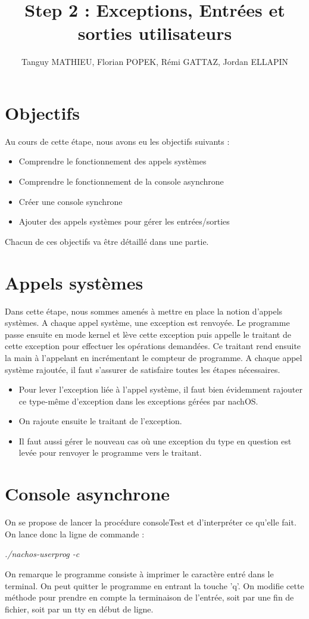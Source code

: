 \documentclass[a4paper,10pt]{article}
\title{Step 2 : Exceptions, Entrées et sorties utilisateurs}
\author{Tanguy MATHIEU, Florian POPEK, Rémi GATTAZ, Jordan ELLAPIN}
\begin{document}
\maketitle
\tableofcontents

\newpage
\section{Objectifs}
    Au cours de cette étape, nous avons eu les objectifs suivants :
    \begin{itemize}
        \item Comprendre le fonctionnement des appels systèmes
        \item Comprendre le fonctionnement de la console asynchrone
        \item Créer une console synchrone
        \item Ajouter des appels systèmes pour gérer les entrées/sorties
    \end{itemize}

    Chacun de ces objectifs va être détaillé dans une partie.

\section{Appels systèmes}
    Dans cette étape, nous sommes amenés à mettre en place la notion d'appels systèmes. A chaque appel système, une exception est renvoyée. Le programme passe ensuite en mode kernel et lève cette exception puis appelle le traitant de cette exception pour effectuer les opérations demandées. Ce traitant rend ensuite la main à l'appelant en incrémentant le compteur de programme. A chaque appel système rajoutée, il faut s'assurer de satisfaire toutes les étapes nécessaires.

    \begin{itemize}
        \item Pour lever l'exception liée à l'appel système, il faut bien évidemment rajouter ce type-même d'exception dans les exceptions gérées par nachOS.
        \item On rajoute ensuite le traitant de l'exception.
        \item Il faut aussi gérer le nouveau cas où une exception du type en question est levée pour renvoyer le programme vers le traitant.
    \end{itemize}

\section{Console asynchrone}
    On se propose de lancer la procédure consoleTest et d'interpréter ce qu'elle fait. On lance donc la ligne de commande :
    \begin{center}
        \emph{./nachos-userprog -c }
    \end{center}
    On remarque le programme consiste à imprimer le caractère entré dans le terminal. On peut quitter le programme en entrant la touche 'q'.
    On modifie cette méthode pour prendre en compte la terminaison de l'entrée, soit par une fin de fichier, soit par un tty en début de ligne.
\end{document}
